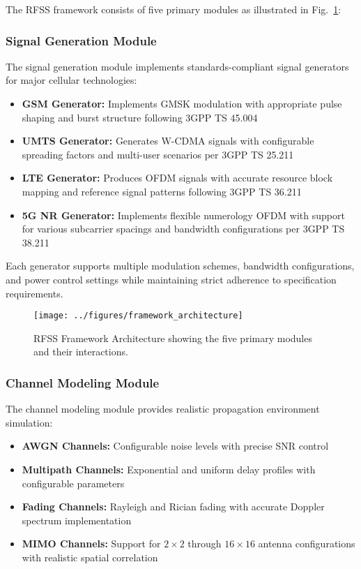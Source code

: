 \documentclass[conference]{IEEEtran}
\begin{document}
The RFSS framework consists of five primary modules as illustrated in Fig.~\ref{fig:architecture}:

\subsubsection{Signal Generation Module}

The signal generation module implements standards-compliant signal generators for major cellular technologies:

\begin{itemize}
\item \textbf{GSM Generator:} Implements GMSK modulation with appropriate pulse shaping and burst structure following 3GPP TS 45.004
\item \textbf{UMTS Generator:} Generates W-CDMA signals with configurable spreading factors and multi-user scenarios per 3GPP TS 25.211
\item \textbf{LTE Generator:} Produces OFDM signals with accurate resource block mapping and reference signal patterns following 3GPP TS 36.211
\item \textbf{5G NR Generator:} Implements flexible numerology OFDM with support for various subcarrier spacings and bandwidth configurations per 3GPP TS 38.211
\end{itemize}

Each generator supports multiple modulation schemes, bandwidth configurations, and power control settings while maintaining strict adherence to specification requirements.

\begin{figure}[!t]
\centering
\texttt{[image: ../figures/framework\_architecture]}
\caption{RFSS Framework Architecture showing the five primary modules and their interactions.}
\label{fig:architecture}
\end{figure}

\subsubsection{Channel Modeling Module}

The channel modeling module provides realistic propagation environment simulation:

\begin{itemize}
\item \textbf{AWGN Channels:} Configurable noise levels with precise SNR control
\item \textbf{Multipath Channels:} Exponential and uniform delay profiles with configurable parameters
\item \textbf{Fading Channels:} Rayleigh and Rician fading with accurate Doppler spectrum implementation
\item \textbf{MIMO Channels:} Support for $2 \times 2$ through $16 \times 16$ antenna configurations with realistic spatial correlation
\end{itemize}
\end{document}
